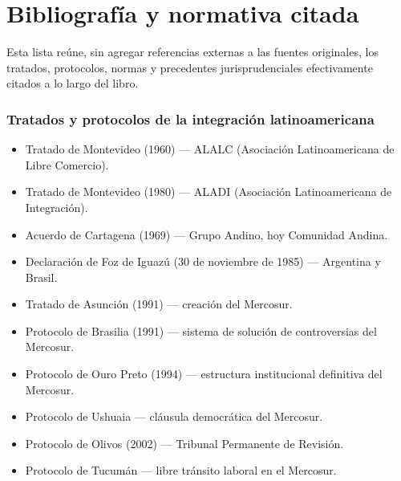 \documentclass[12pt,oneside]{book}
\begin{document}
\chapter*{Bibliografía y normativa citada}

Esta lista reúne, sin agregar referencias externas a las fuentes originales, los tratados, protocolos, normas y precedentes jurisprudenciales efectivamente citados a lo largo del libro.

\subsection*{Tratados y protocolos de la integración latinoamericana}
\begin{itemize}
    \item Tratado de Montevideo (1960) --- ALALC (Asociación Latinoamericana de Libre Comercio).
    \item Tratado de Montevideo (1980) --- ALADI (Asociación Latinoamericana de Integración).
    \item Acuerdo de Cartagena (1969) --- Grupo Andino, hoy Comunidad Andina.
    \item Declaración de Foz de Iguazú (30 de noviembre de 1985) --- Argentina y Brasil.
    \item Tratado de Asunción (1991) --- creación del Mercosur.
    \item Protocolo de Brasilia (1991) --- sistema de solución de controversias del Mercosur.
    \item Protocolo de Ouro Preto (1994) --- estructura institucional definitiva del Mercosur.
    \item Protocolo de Ushuaia --- cláusula democrática del Mercosur.
    \item Protocolo de Olivos (2002) --- Tribunal Permanente de Revisión.
    \item Protocolo de Tucumán --- libre tránsito laboral en el Mercosur.
\end{itemize}
\end{document}
